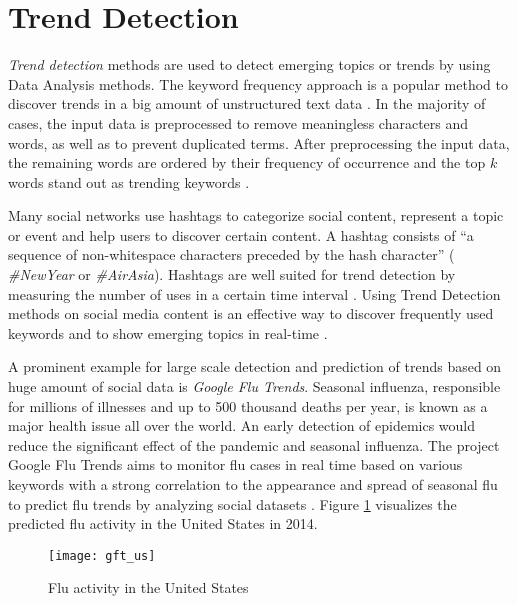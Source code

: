 \section{Trend Detection}
\label{sec:trends}
\textit{Trend detection} methods are used to detect emerging topics or trends by using Data Analysis methods. The keyword frequency approach is a popular method to discover trends in a big amount of unstructured text data \cite{journals/smarthome/Kim+13}. In the majority of cases, the input data is preprocessed to remove meaningless characters and words, as well as to prevent duplicated terms. After preprocessing the input data, the remaining words are ordered by their frequency of occurrence and the top $k$ words stand out as trending keywords \cite[213\psq]{journals/smarthome/Kim+13}.

Many social networks use hashtags to categorize social content, represent a topic or event and help users to discover certain content. A hashtag consists of \enquote{a sequence of non-whitespace characters preceded by the hash character} \cites[644]{conf/wsdm/TsurR12}[1427]{conf/asunam/ZhangWL13} (\eg{} \textit{\#NewYear} or \textit{\#AirAsia}). Hashtags are well suited for trend detection by measuring the number of uses in a certain time interval \cite[1427]{conf/asunam/ZhangWL13}. Using Trend Detection methods on social media content is an effective way to discover frequently used keywords and to show emerging topics in real-time \cite{journals/smarthome/Kim+13,TwitterDataAnalytics2013}.

A prominent example for large scale detection and prediction of trends based on huge amount of social data is \textit{Google Flu Trends}. Seasonal influenza, responsible for millions of illnesses and up to 500 thousand deaths per year, is known as a major health issue all over the world. An early detection of epidemics would reduce the significant effect of the pandemic and seasonal influenza. The project Google Flu Trends aims to monitor flu cases in real time based on various keywords with a strong correlation to the appearance and spread of seasonal flu to predict flu trends by analyzing social datasets \cites{Google09detection}[1]{Weber2014,Tech22014}. Figure \ref{fig:use_case_gft} visualizes the predicted flu activity in the United States in 2014.

\begin{figure}[H]
  \centering
        \texttt{[image: gft\_us]}
  \caption[Flu activity in the United States]{Flu activity in the United States \cite{gft2014}}
  \label{fig:use_case_gft}
  \vspace{-1.3em}
\end{figure}